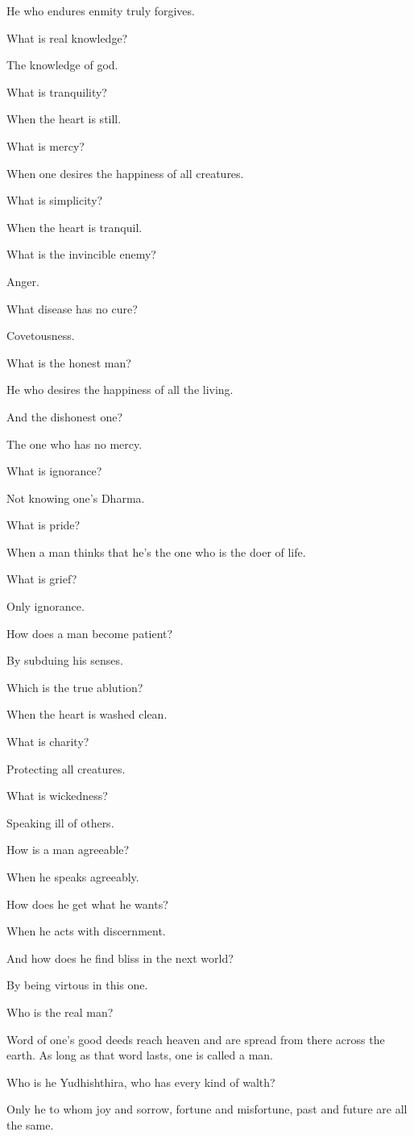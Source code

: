 He who endures enmity truly forgives.

What is real knowledge?

The knowledge of god.

What is tranquility?

When the heart is still.

What is mercy?

When one desires the happiness of all creatures.

What is simplicity?

When the heart is tranquil.

What is the invincible enemy?

Anger.

What disease has no cure?

Covetousness.

What is the honest man?

He who desires the happiness of all the living.

And the dishonest one?

The one who has no mercy.

What is ignorance?

Not knowing one's Dharma.

What is pride?

When a man thinks that he's the one who is the doer of life.

What is grief?

Only ignorance.

How does a man become patient?

By subduing his senses.

Which is the true ablution?

When the heart is washed clean.

What is charity?

Protecting all creatures.

What is wickedness?

Speaking ill of others.

How is a man agreeable?

When he speaks agreeably.

How does he get what he wants?

When he acts with discernment.

And how does he find bliss in the next world?

By being virtous in this one.

Who is the real man?

Word of one's good deeds reach heaven and are spread from there across the earth.
As long as that word lasts, one is called a man.

Who is he Yudhishthira, who has every kind of walth?

Only he to whom joy and sorrow, fortune and misfortune, past and future are all the same.
